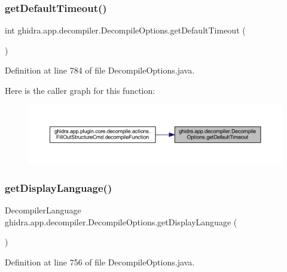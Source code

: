 \subsubsection{\texorpdfstring{getDefaultTimeout()}{getDefaultTimeout()}}
{\footnotesize\ttfamily int ghidra.\+app.\+decompiler.\+Decompile\+Options.\+get\+Default\+Timeout (\begin{DoxyParamCaption}{ }\end{DoxyParamCaption})\hspace{0.3cm}{\ttfamily [inline]}}



Definition at line 784 of file Decompile\+Options.\+java.

Here is the caller graph for this function\+:
\nopagebreak
\begin{figure}[H]
\begin{center}
\leavevmode
\includegraphics[width=350pt]{classghidra_1_1app_1_1decompiler_1_1_decompile_options_a619edd5e5c044dcad26a1a8dbea33018_icgraph}
\end{center}
\end{figure}
\mbox{\label{classghidra_1_1app_1_1decompiler_1_1_decompile_options_a41e330621e2523726bbfdd596c7096f1}} 
\subsubsection{\texorpdfstring{getDisplayLanguage()}{getDisplayLanguage()}}
{\footnotesize\ttfamily Decompiler\+Language ghidra.\+app.\+decompiler.\+Decompile\+Options.\+get\+Display\+Language (\begin{DoxyParamCaption}{ }\end{DoxyParamCaption})\hspace{0.3cm}{\ttfamily [inline]}}



Definition at line 756 of file Decompile\+Options.\+java.

